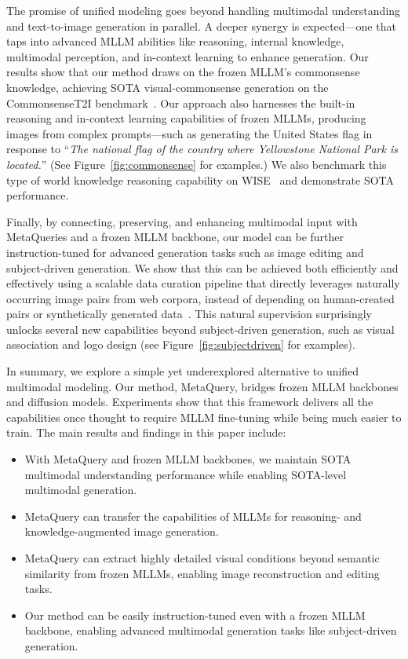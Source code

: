\documentclass[]{fairmeta}
\newcommand\our{{\fontfamily{lmtt}\selectfont MetaQuery}\xspace}
\newcommand\ours{{\fontfamily{lmtt}\selectfont MetaQueries}\xspace}
\begin{document}
The promise of unified modeling goes beyond handling multimodal understanding and text-to-image generation in parallel. A deeper synergy is expected---one that taps into advanced MLLM abilities like reasoning, internal knowledge, multimodal perception, and in-context learning to enhance generation. Our results show that our method draws on the frozen MLLM's commonsense knowledge, achieving SOTA visual-commonsense generation on the CommonsenseT2I benchmark~\citep{commonsenset2i}. Our approach also harnesses the built-in reasoning and in-context learning capabilities of frozen MLLMs, producing images from complex prompts---such as generating the United States flag in response to ``\emph{The national flag of the country where Yellowstone National Park is located.}'' (See Figure~\ref{fig:commonsense} for examples.) We also benchmark this type of world knowledge reasoning capability on WISE~\citep{wise} and demonstrate SOTA performance.

Finally, by connecting, preserving, and enhancing multimodal input with \ours and a frozen MLLM backbone, our model can be further instruction-tuned for advanced generation tasks such as image editing and subject-driven generation. We show that this can be achieved both efficiently and effectively using a scalable data curation pipeline that directly leverages naturally occurring image pairs from web corpora, instead of depending on human-created pairs or synthetically generated data~\citep{Instructpix2pix, instructimagen, Omnigen}. This natural supervision surprisingly unlocks several new capabilities beyond subject-driven generation, such as visual association and logo design (see Figure~\ref{fig:subjectdriven} for examples).

In summary, we explore a simple yet underexplored alternative to unified multimodal modeling. Our method, \our, bridges frozen MLLM backbones and diffusion models. Experiments show that this framework delivers all the capabilities once thought to require MLLM fine-tuning while being much easier to train. The main results and findings in this paper include:
\begin{itemize}
    \item With \our and frozen MLLM backbones, we maintain SOTA multimodal understanding performance while enabling SOTA-level multimodal generation.
    \item \our can transfer the capabilities of MLLMs for reasoning- and knowledge-augmented image generation.
    \item \our can extract highly detailed visual conditions beyond semantic similarity from frozen MLLMs, enabling image reconstruction and editing tasks.
    \item Our method can be easily instruction-tuned even with a frozen MLLM backbone, enabling advanced multimodal generation tasks like subject-driven generation.
\end{itemize}
\end{document}
